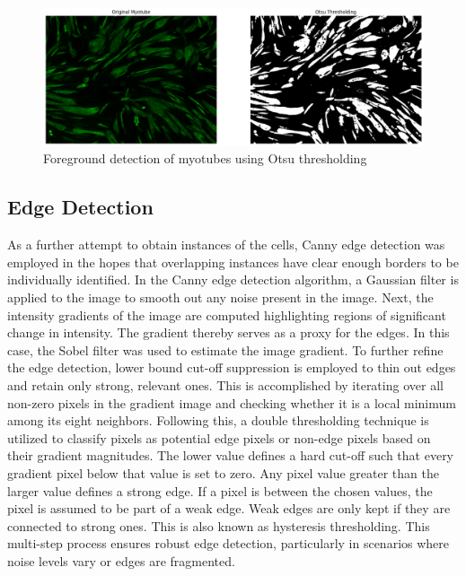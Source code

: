 \begin{figure}
	\centering
	\includegraphics[width=\textwidth]{"images/otsu_tube.png"}
	\caption[Otsu thresholding applied to myotubes]{Foreground detection of myotubes using Otsu thresholding}
	\label{figotsutube}
\end{figure}
\newpage
\subsection{Edge Detection}
As a further attempt to obtain instances of the cells, Canny edge detection \cite{canny} was employed in the hopes that overlapping instances have clear enough borders to be individually identified. In the Canny edge detection algorithm, a Gaussian filter is applied to the image to smooth out any noise present in the image. Next, the intensity gradients of the image are computed highlighting regions of significant change in intensity. The gradient thereby serves as a proxy for the edges. In this case, the Sobel filter \cite{Gonzalez1992} was used to estimate the image gradient. To further refine the edge detection, lower bound cut-off suppression is employed to thin out edges and retain only strong, relevant ones. This is accomplished by iterating over all non-zero pixels in the gradient image and checking whether it is a local minimum among its eight neighbors. Following this, a double thresholding technique is utilized to classify pixels as potential edge pixels or non-edge pixels based on their gradient magnitudes. The lower value defines a hard cut-off such that every gradient pixel below that value is set to zero. Any pixel value greater than the larger value defines a strong edge. If a pixel is between the chosen values, the pixel is assumed to be part of a weak edge. Weak edges are only kept if they are connected to strong ones. This is also known as hysteresis thresholding. This multi-step process ensures robust edge detection, particularly in scenarios where noise levels vary or edges are fragmented.
